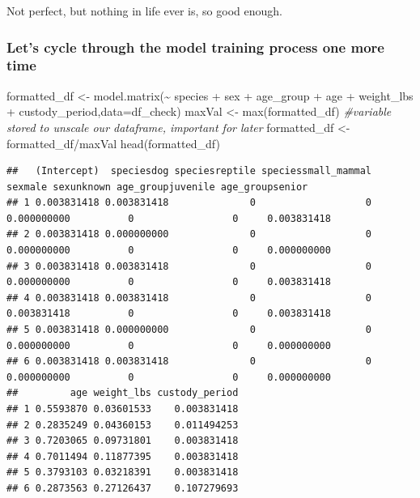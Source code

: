 \documentclass[
]{article}
\newenvironment{Shaded}{\begin{snugshade}}{\end{snugshade}}
\newcommand{\AttributeTok}[1]{\textcolor[rgb]{0.77,0.63,0.00}{#1}}
\newcommand{\CommentTok}[1]{\textcolor[rgb]{0.56,0.35,0.01}{\textit{#1}}}
\newcommand{\FunctionTok}[1]{\textcolor[rgb]{0.00,0.00,0.00}{#1}}
\newcommand{\NormalTok}[1]{#1}
\newcommand{\OtherTok}[1]{\textcolor[rgb]{0.56,0.35,0.01}{#1}}
\newcommand{\SpecialCharTok}[1]{\textcolor[rgb]{0.00,0.00,0.00}{#1}}
\begin{document}
Not perfect, but nothing in life ever is, so good enough.

\hypertarget{lets-cycle-through-the-model-training-process-one-more-time}{%
\subsubsection{Let's cycle through the model training process one more
time}\label{lets-cycle-through-the-model-training-process-one-more-time}}

\begin{Shaded}
\begin{Highlighting}[]
\NormalTok{formatted\_df }\OtherTok{\textless{}{-}} \FunctionTok{model.matrix}\NormalTok{(}\SpecialCharTok{\textasciitilde{}}\NormalTok{ species }\SpecialCharTok{+}\NormalTok{ sex }\SpecialCharTok{+}\NormalTok{ age\_group }\SpecialCharTok{+}\NormalTok{ age }\SpecialCharTok{+}\NormalTok{ weight\_lbs }\SpecialCharTok{+}\NormalTok{ custody\_period,}\AttributeTok{data=}\NormalTok{df\_check)}
\NormalTok{maxVal }\OtherTok{\textless{}{-}} \FunctionTok{max}\NormalTok{(formatted\_df) }\CommentTok{\#variable stored to unscale our dataframe, important for later}
\NormalTok{formatted\_df }\OtherTok{\textless{}{-}}\NormalTok{ formatted\_df}\SpecialCharTok{/}\NormalTok{maxVal}
\FunctionTok{head}\NormalTok{(formatted\_df)}
\end{Highlighting}
\end{Shaded}

\begin{verbatim}
##   (Intercept)  speciesdog speciesreptile speciessmall_mammal     sexmale sexunknown age_groupjuvenile age_groupsenior
## 1 0.003831418 0.003831418              0                   0 0.000000000          0                 0     0.003831418
## 2 0.003831418 0.000000000              0                   0 0.000000000          0                 0     0.000000000
## 3 0.003831418 0.003831418              0                   0 0.000000000          0                 0     0.003831418
## 4 0.003831418 0.003831418              0                   0 0.003831418          0                 0     0.003831418
## 5 0.003831418 0.000000000              0                   0 0.000000000          0                 0     0.000000000
## 6 0.003831418 0.003831418              0                   0 0.000000000          0                 0     0.000000000
##         age weight_lbs custody_period
## 1 0.5593870 0.03601533    0.003831418
## 2 0.2835249 0.04360153    0.011494253
## 3 0.7203065 0.09731801    0.003831418
## 4 0.7011494 0.11877395    0.003831418
## 5 0.3793103 0.03218391    0.003831418
## 6 0.2873563 0.27126437    0.107279693
\end{verbatim}
\end{document}
